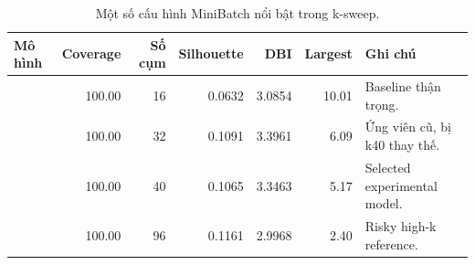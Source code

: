 \begin{table}[H]
\centering
\scriptsize
\caption{Một số cấu hình MiniBatch nổi bật trong k-sweep.}
\label{tab:k-sweep-decision}
\begin{tabularx}{\textwidth}{L{0.34\textwidth} r r r r r Y}
\toprule
Mô hình & Coverage & Số cụm & Silhouette & DBI & Largest & Ghi chú \\
\midrule
{} & 100.00 & 16 & 0.0632 & 3.0854 & 10.01 & Baseline thận trọng. \\
 & 100.00 & 32 & 0.1091 & 3.3961 & 6.09 & Ứng viên cũ, bị k40 thay thế. \\
 & 100.00 & 40 & 0.1065 & 3.3463 & 5.17 & Selected experimental model. \\
 & 100.00 & 96 & 0.1161 & 2.9968 & 2.40 & Risky high-k reference. \\
\bottomrule
\end{tabularx}
\end{table}
